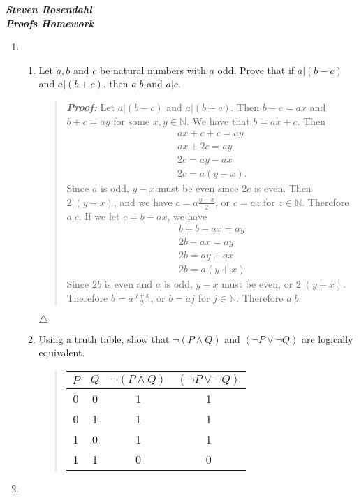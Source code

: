 \documentclass{article}
\newcommand{\Proof}{\textit{\textbf{Proof: }}}
\newcommand{\NN}{\mathbb{N}}
\begin{document}
\noindent\textit{\textbf{Steven Rosendahl}}\\
\textit{\textbf{Proofs Homework}}
\begin{enumerate}
\item
\begin{enumerate}
\item Let $a,b$ and $c$ be natural numbers with $a$ odd.
Prove that if $a|(b -c)$ and $a|(b+c)$, then $a|b$ and $a|c$.
\begin{quote}
\indent \Proof Let $a|(b-c)$ and $a|(b + c)$.
Then $b-c = ax$ and $b + c = ay$ for some $x,y\in \NN$.
We have that $b = ax + c$.
Then
\begin{gather*}
ax + c + c = ay\\
ax + 2c = ay\\
2c = ay - ax\\
2c = a(y-x).
\end{gather*}
Since $a$ is odd, $y-x$ must be even since $2c$ is even.
Then $2 | (y-x)$, and we have $c = a\frac{y-x}{2}$, or $c = az$ for $z\in\NN$.
Therefore $a | c$.
If we let $c = b-ax$, we have
\begin{gather*}
b + b - ax = ay\\
2b - ax = ay\\
2b = ay + ax\\
2b = a(y + x)
\end{gather*}
Since $2b$ is even and $a$ is odd, $y-x$ must be even, or $2 | (y+x)$.
Therefore $b = a\frac{y+x}{2}$, or $b = aj$ for $j\in\NN$.
Therefore $a | b$.
\end{quote}
$\triangle$
\item Using a truth table, show that $\neg(P\wedge Q)$ and $(\neg P \vee \neg Q)$ are logically equivalent.\\
\begin{quote}
\begin{center}
\begin{tabular}{c | c | c | c}
$P$ & $Q$ & $\neg(P\wedge Q)$ & $(\neg P \vee \neg Q)$\\
\hline
0 & 0 & 1 & 1\\
0 & 1 & 1 & 1\\
1 & 0 & 1 & 1\\
1 & 1 & 0 & 0
\end{tabular}
\end{center}
\end{quote}
\end{enumerate}
\newpage
\item
\begin{enumerate}

\end{enumerate}
\end{enumerate}
\end{document}
